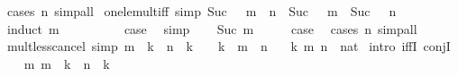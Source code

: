 \begin{isabellebody}
\ {\isacharparenleft}{\kern0pt}cases\ n{\isacharparenright}{\kern0pt}\ simp{\isacharunderscore}{\kern0pt}all\isanewline
{}\isamarkupfalse%
%
\endisatagproof
{\isafoldproof}%
%
\isadelimproof
\isanewline
%
\endisadelimproof
\isanewline
{}\isamarkupfalse%
\ one{\isacharunderscore}{\kern0pt}le{\isacharunderscore}{\kern0pt}mult{\isacharunderscore}{\kern0pt}iff\ {\isacharbrackleft}{\kern0pt}simp{\isacharbrackright}{\kern0pt}{\isacharcolon}{\kern0pt}\ {\isachardoublequoteopen}Suc\ {}\ {\isasymle}\ m\ {\isacharasterisk}{\kern0pt}\ n\ {\isasymlongleftrightarrow}\ Suc\ {}\ {\isasymle}\ m\ {\isasymand}\ Suc\ {}\ {\isasymle}\ n{\isachardoublequoteclose}\isanewline
%
\isadelimproof
%
\endisadelimproof
%
\isatagproof
{}\isamarkupfalse%
\ {\isacharparenleft}{\kern0pt}induct\ m{\isacharparenright}{\kern0pt}\isanewline
\ \ \isamarkupfalse%
\ {}\isanewline
\ \ \isamarkupfalse%
\ \isamarkupfalse%
\ {\isacharquery}{\kern0pt}case\ \isamarkupfalse%
\ simp\isanewline
{}\isamarkupfalse%
\isanewline
\ \ \isamarkupfalse%
\ {\isacharparenleft}{\kern0pt}Suc\ m{\isacharparenright}{\kern0pt}\isanewline
\ \ \isamarkupfalse%
\ \isamarkupfalse%
\ {\isacharquery}{\kern0pt}case\ \isamarkupfalse%
\ {\isacharparenleft}{\kern0pt}cases\ n{\isacharparenright}{\kern0pt}\ simp{\isacharunderscore}{\kern0pt}all\isanewline
{}\isamarkupfalse%
%
\endisatagproof
{\isafoldproof}%
%
\isadelimproof
\isanewline
%
\endisadelimproof
\isanewline
{}\isamarkupfalse%
\ mult{\isacharunderscore}{\kern0pt}less{\isacharunderscore}{\kern0pt}cancel{}\ {\isacharbrackleft}{\kern0pt}simp{\isacharbrackright}{\kern0pt}{\isacharcolon}{\kern0pt}\ {\isachardoublequoteopen}m\ {\isacharasterisk}{\kern0pt}\ k\ {\isacharless}{\kern0pt}\ n\ {\isacharasterisk}{\kern0pt}\ k\ {\isasymlongleftrightarrow}\ {}\ {\isacharless}{\kern0pt}\ k\ {\isasymand}\ m\ {\isacharless}{\kern0pt}\ n{\isachardoublequoteclose}\isanewline
\ \ \ k\ m\ n\ {\isacharcolon}{\kern0pt}{\isacharcolon}{\kern0pt}\ nat\isanewline
%
\isadelimproof
%
\endisadelimproof
%
\isatagproof
{}\isamarkupfalse%
\ {\isacharparenleft}{\kern0pt}intro\ iffI\ conjI{\isacharparenright}{\kern0pt}\isanewline
\ \ \isamarkupfalse%
\ m{\isacharcolon}{\kern0pt}\ {\isachardoublequoteopen}m\ {\isacharasterisk}{\kern0pt}\ k\ {\isacharless}{\kern0pt}\ n\ {\isacharasterisk}{\kern0pt}\ k{\isachardoublequoteclose}\isanewline

\end{isabellebody}
